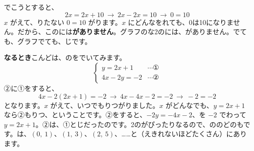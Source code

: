 \par\vspace{4pt}
でこうとすると、
\[ 2x=2x+10\ \to\ 2x-2x=10\ \to\ 0=10 \]
$x$ がえて、りたない $0=10$ がります。$x$ にどんなをれても、0は10になりません。だから、このには\textbf{がありません}。グラフのな2のには、がありません。でても、グラフでても、じです。

\textbf{なるとき}\quad こんどは、のをでいてみます。
\[ \begin{cases} y=2x+1 & \cdots\text{①}\\ 4x-2y=-2 & \cdots\text{②} \end{cases} \]
②に①をすると、
\[ 4x-2(2x+1)=-2\ \to\ 4x-4x-2=-2\ \to\ -2=-2 \]
となります。$x$ がえて、いつでもりつがりました。$x$ がどんなでも、$y=2x+1$ なら②もりつ、ということです。②をすると、$-2y=-4x-2$、を $-2$ でわって $y=2x+1$。②は、①とじだったのです。2のがぴったりなるので、ののどのもです。は、$(0,\ 1)$、$(1,\ 3)$、$(2,\ 5)$、……と\textbf{}（えきれないほどたくさん）にあります。

